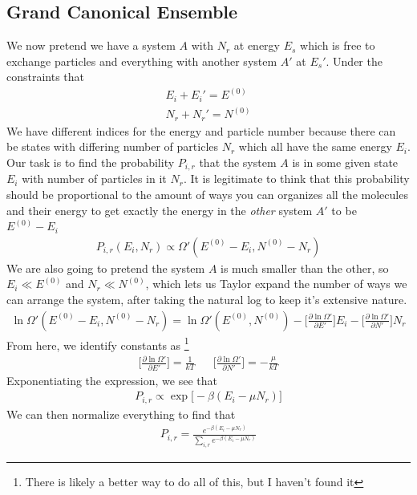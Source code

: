 \subsection{Grand Canonical Ensemble}%
We now pretend we have a system $A$ with $N_r$ at energy $E_s$ which is free to exchange particles and everything with another system $A'$ at $E_s'$. Under the constraints that
\begin{align}
E_i + E_i' = E^{(0)}\\
N_r + N_r' = N^{(0)}
\end{align}
We have different indices for the energy and particle number because there can be states with differing number of particles $N_r$ which all have the same energy $E_i$. Our task is to find the probability $P_{i,r}$ that the system $A$ is in some given state $E_i$ with number of particles in it $N_r$. It is legitimate to think that this probability should be proportional to the amount of ways you can organizes all the molecules and their energy to get exactly the energy in the \emph{other} system $A'$ to be $E^{(0)} - E_i$
\begin{align}
P_{i,r}(E_i,N_r) \propto \Omega'(E^{(0)} - E_i , N^{(0)}- N_r)
\end{align}
We are also going to pretend the system $A$ is much smaller than the other, so $E_i\ll E^{(0)}$ and $N_r \ll N^{(0)}$, which lets us Taylor expand the number of ways we can arrange the system, after taking the natural log to keep it's extensive nature.
\begin{align}
\ln\Omega'(E^{(0)} - E_i , N^{(0)}- N_r) = \ln\Omega'(E^{(0)},N^{(0)}) - \Big[\frac{\partial\ln\Omega'}{\partial E'}\Big] E_i - \Big[\frac{\partial\ln\Omega'}{\partial N'}\Big]N_r
\end{align}
From here, we identify constants as \footnote{There is likely a better way to do all of this, but I haven't found it}
\begin{align}
\Big[\frac{\partial\ln\Omega'}{\partial E'}\Big] = \frac{1}{kT}&&\Big[\frac{\partial\ln\Omega'}{\partial N'}\Big] = -\frac{\mu}{kT}
\end{align}
Exponentiating the expression, we see that 
\begin{align}
P_{i,r}\propto\exp\Big[-\beta(E_i-\mu N_r)\Big]
\end{align}
We can then normalize everything to find that
\begin{align}
P_{i,r} = \frac{e^{-\beta(E_i-\mu N_r)}}{\sum_{i,r}e^{-\beta(E_i-\mu N_r)}}
\end{align}




